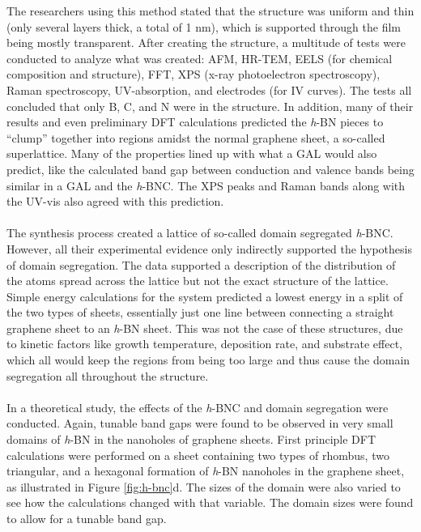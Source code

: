 \documentclass[11pt]{article}
\begin{document}
\begin{multicols}{2}
The researchers using this method stated that the structure was uniform and thin (only several layers thick, a total of 1 nm), which is supported through the film being mostly transparent.\cite{synth} After creating the structure, a multitude of tests were conducted to analyze what was created: AFM, HR-TEM, EELS (for chemical composition and structure), FFT, XPS (x-ray photoelectron spectroscopy), Raman spectroscopy, UV-absorption, and electrodes (for IV curves). The tests all concluded that only B, C, and N were in the structure. In addition, many of their results and even preliminary DFT calculations predicted the \textit{h}-BN pieces to ``clump'' together into regions amidst the normal graphene sheet, a so-called superlattice.\cite{synth} Many of the properties lined up with what a GAL would also predict, like the calculated band gap between conduction and valence bands being similar in a GAL and the \textit{h}-BNC. The XPS peaks and Raman bands along with the UV-vis also agreed with this prediction. \\ \\

The synthesis process created a lattice of so-called domain segregated \textit{h}-BNC. However, all their experimental evidence only indirectly supported the hypothesis of domain segregation. The data supported a description of the distribution of the atoms spread across the lattice but not the exact structure of the lattice. Simple energy calculations for the system predicted a lowest energy in a split of the two types of sheets, essentially just one line between connecting a straight graphene sheet to an \textit{h}-BN sheet. This was not the case of these structures, due to kinetic factors like growth temperature, deposition rate, and substrate effect, which all would keep the regions from being too large and thus cause the domain segregation all throughout the structure.\cite{synth} \\ \\

In a theoretical study, the effects of the \textit{h}-BNC and domain segregation were conducted.\cite{main} Again, tunable band gaps were found to be observed in very small domains of \textit{h}-BN in the nanoholes of graphene sheets. First principle DFT calculations were performed on a sheet containing two types of rhombus, two triangular, and a hexagonal formation of \textit{h}-BN nanoholes in the graphene sheet, as illustrated in Figure \ref{fig:h-bnc}d. The sizes of the domain were also varied to see how the calculations changed with that variable. The domain sizes were found to allow for a tunable band gap. \\ \\


\end{multicols}
\end{document}

